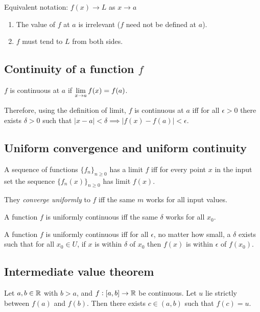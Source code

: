 Equivalent notation: $f(x) \to L$ as $x \to a$

\begin{remark*}\hspace{0pt}
  \begin{enumerate}
  \item The value of $f$ at $a$ is irrelevant ($f$ need not be defined at $a$).
  \item $f$ must tend to $L$ from both sides.
  \end{enumerate}
\end{remark*}

\subsection{Continuity of a function $f$}

\begin{definition*}
$f$ is continuous at $a$ if $\LimEq{f(x)}{f(a)}{x}{a}$.
\end{definition*}

Therefore, using the definition of limit, $f$ is continuous at $a$ iff for all $\epsilon > 0$
there exists $\delta > 0$ such that $|x - a| < \delta \implies |f(x) - f(a)| < \epsilon$.

\subsection{Uniform convergence and uniform continuity}

\begin{definition*}
A sequence of functions $\{f_n\}_{n\geq 0}$ has a limit $f$ iff for every point
$x$ in the input set the sequence $\{f_n(x)\}_{n\geq 0}$ has limit $f(x)$.

They \textit{converge uniformly} to $f$ iff the same $m$ works for all input
values.
\end{definition*}

\begin{definition*}
A function $f$ is uniformly continuous iff the same $\delta$ works for all $x_0$.

A function $f$ is uniformly continuous iff for all $\epsilon$, no matter how
small, a $\delta$ exists such that for all $x_0 \in U$, if $x$ is within
$\delta$ of $x_0$ then $f(x)$ is within $\epsilon$ of $f(x_0)$.
\end{definition*}

\subsection{Intermediate value theorem}
\begin{theorem*}
  Let $a, b \in \R$ with $b > a$, and $f:[a,b] \to \R$ be continuous. Let $u$ lie strictly between
  $f(a)$ and $f(b)$. Then there exists $c \in (a, b)$ such that $f(c) = u$.
\end{theorem*}

